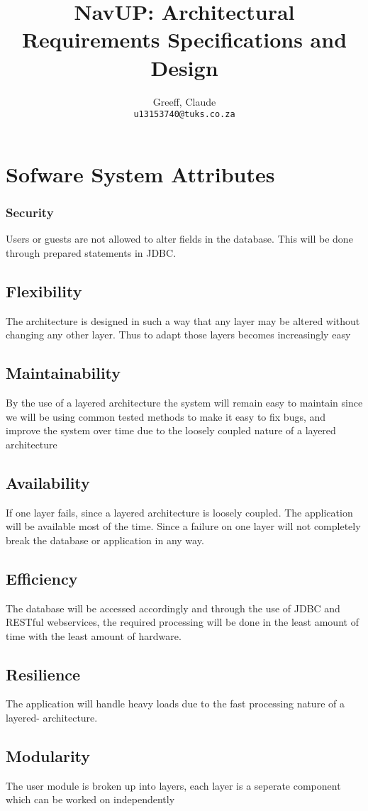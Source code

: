 \documentclass{article}
\title{NavUP: Architectural Requirements Specifications and Design}
\author{	 
	Greeff, Claude\\
	\texttt{u13153740@tuks.co.za}
	\and	
}
\begin{document}
	\maketitle
	\section{Sofware System Attributes}
 
		 \subsubsection{Security}
		Users or guests are not allowed to alter fields in the database. This will be done through prepared statements in JDBC.
		\subsection{Flexibility}
		The architecture is designed in such a way that any layer  may be altered without changing any other layer. Thus to adapt those layers becomes increasingly easy

		\subsection{Maintainability}
		By the use of a layered architecture the system will remain easy to maintain since we will be using common tested methods to make it easy to fix bugs, and improve the system over time due to the loosely coupled nature of a layered architecture
		\subsection{Availability}
		If one layer fails, since a layered architecture is loosely coupled. The application will be available most of the time. Since a failure on one layer will not completely break the database or application in any way.
		\subsection{Efficiency}
		The database will be accessed accordingly and through the use of JDBC and RESTful webservices, the required processing will be done in the least amount of time with the least amount of hardware.
		\subsection{Resilience}
		The application will handle heavy loads due to the fast processing nature of a layered- architecture.
		\subsection{Modularity}
		The user module is broken up into layers, each layer is a seperate component which can be worked on independently

 		
	
\end{document}
